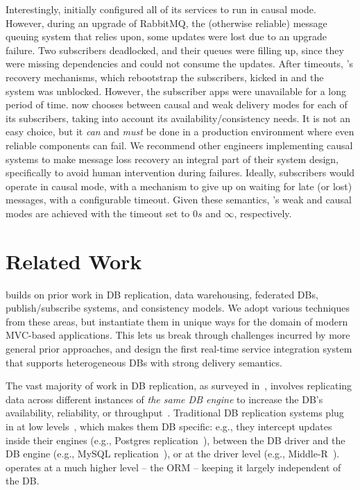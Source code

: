  Interestingly, \crowdtap initially
configured all of its services to run in causal mode.  However, during an
upgrade of RabbitMQ, the (otherwise reliable) message queuing system that
\synapse relies upon, some updates were lost due to an upgrade failure.
Two subscribers deadlocked, and their queues were filling up, since they were
missing dependencies and could not consume the updates.  After timeouts, \synapse's
recovery mechanisms, which rebootstrap the subscribers, kicked in
and the system was unblocked.  However, the subscriber apps were unavailable for
a long period of time. \crowdtap now chooses between causal and weak delivery
modes for each of its subscribers, taking into account its availability/consistency
needs.  It is not an easy choice, but it {\em can} and {\em must}
be done in a production environment where even reliable components can fail.
We recommend other engineers implementing causal systems to make message loss
recovery an \mbox{integral} part of their system design, specifically to avoid human
intervention during failures.
Ideally, subscribers would operate in causal mode, with a mechanism to give up
on waiting for late (or lost) messages, with a configurable timeout.
Given these semantics, \synapse's weak and causal modes are achieved with
the timeout set to $0s$ and $\infty$, respectively.

\section{Related Work}  
\label{synapse:sec:related}

\synapse builds on prior work in
DB replication, data warehousing, federated
DBs, publish/subscribe systems, and consistency models. We adopt various techniques from
these areas, but instantiate them in unique ways for the domain of modern
MVC-based applications. This lets us break through challenges incurred by more
general prior approaches, and design the first real-time service integration
system that supports heterogeneous DBs with strong delivery semantics.

The vast majority of work in DB
replication, as surveyed in~\cite{candea-db-replication}, involves replicating data 
across different instances of {\em the same DB engine} to increase the DB's
availability, reliability, or throughput~\cite{pnuts}. Traditional DB replication systems
plug in at low levels~\cite{candea-db-replication}, which makes them DB
specific: e.g., they intercept updates inside their engines (e.g., Postgres
replication~\cite{postgres-r}), between the DB driver and the DB engine (e.g.,
MySQL replication~\cite{mysql-replication}), or at the driver level (e.g.,
Middle-R~\cite{middle-r}).  \synapse operates at a much higher level -- the
ORM -- keeping it largely independent of the DB.

